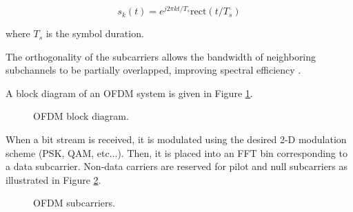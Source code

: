 \documentclass[conference]{IEEEtran}
\begin{document}
	 	\begin{equation}
	 		s_k(t) = e^{j2{\pi}kt/T_s}\text{rect}(t/T_s)
	 	\end{equation}
	 	
	 	where $T_s$ is the symbol duration.
	 	
	 	The orthogonality of the subcarriers allows the bandwidth of neighboring subchannels to be partially overlapped, improving spectral efficiency \cite{djordjevic-2017}.
	 	
	 	A block diagram of an OFDM system is given in Figure \ref{fig::ofdm_block_diagram}.
		
	 	\begin{figure}[H]
	    		\centering
	    		\caption{OFDM block diagram.\cite {10.1007/978-981-16-2406-3_61}}
	    		\label{fig::ofdm_block_diagram}
		\end{figure}
		
		When a bit stream is received, it is modulated using the desired 2-D modulation scheme (PSK, QAM, etc...). Then, it is placed into an FFT bin corresponding to a data subcarrier. Non-data carriers are reserved for pilot and null subcarriers as illustrated in Figure \ref{fig::ofdm_subcarriers}.
		
		\begin{figure}[H]
	    		\centering
	    		\caption{OFDM subcarriers. \cite {inproceedings}}
	    		\label{fig::ofdm_subcarriers}
		\end{figure}
		
\end{document}
